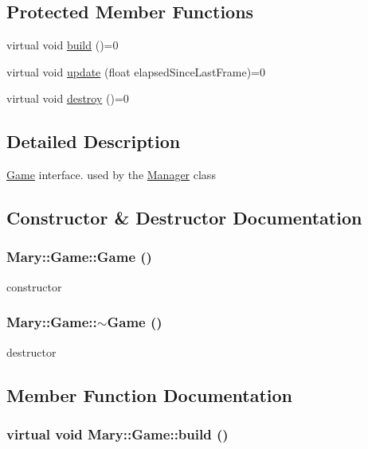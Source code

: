 \subsection*{Protected Member Functions}
\begin{CompactItemize}
\item 
virtual void \hyperlink{class_mary_1_1_game_7880bac586d9388b98a00a846199adbc}{build} ()=0
\item 
virtual void \hyperlink{class_mary_1_1_game_9c5be30e806dd6419a5d44b398ece955}{update} (float elapsedSinceLastFrame)=0
\item 
virtual void \hyperlink{class_mary_1_1_game_7b8b8ce9b58091229320816e3241fd98}{destroy} ()=0
\end{CompactItemize}


\subsection{Detailed Description}
\hyperlink{class_mary_1_1_game}{Game} interface. used by the \hyperlink{class_mary_1_1_manager}{Manager} class 

\subsection{Constructor \& Destructor Documentation}
\hypertarget{class_mary_1_1_game_1dd0363361b2487f464fb3b0690b5d83}{
\subsubsection[Game]{\setlength{\rightskip}{0pt plus 5cm}Mary::Game::Game ()}}
\label{class_mary_1_1_game_1dd0363361b2487f464fb3b0690b5d83}


constructor \hypertarget{class_mary_1_1_game_752202eeaee91035b079e49a3e9a37cf}{
\subsubsection[$\sim$Game]{\setlength{\rightskip}{0pt plus 5cm}Mary::Game::$\sim$Game ()}}
\label{class_mary_1_1_game_752202eeaee91035b079e49a3e9a37cf}


destructor 

\subsection{Member Function Documentation}
\hypertarget{class_mary_1_1_game_7880bac586d9388b98a00a846199adbc}{
\subsubsection[build]{\setlength{\rightskip}{0pt plus 5cm}virtual void Mary::Game::build ()}}
\label{class_mary_1_1_game_7880bac586d9388b98a00a846199adbc}


